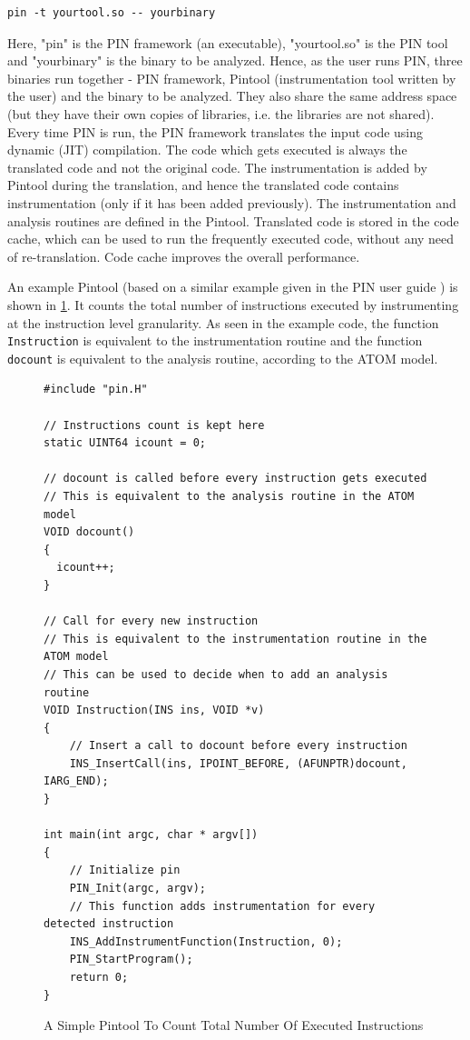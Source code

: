 \begin{lstlisting}
pin -t yourtool.so -- yourbinary
\end{lstlisting}
Here, "pin" is the PIN framework (an executable), "yourtool.so" is the PIN tool and "yourbinary" is the binary to be analyzed. Hence, as the user runs PIN, three binaries run together - PIN framework, Pintool (instrumentation tool written by the user) and the binary to be analyzed. They also share the same address space (but they have their own copies of libraries, i.e. the libraries are not shared). Every time PIN is run, the PIN framework translates the input code using dynamic (JIT) compilation. The code which gets executed is always the translated code and not the original code. The instrumentation is added by Pintool during the translation, and hence the translated code contains instrumentation (only if it has been added previously). The instrumentation and analysis routines are defined in the Pintool. Translated code is stored in the code cache, which can be used to run the frequently executed code, without any need of re-translation. Code cache improves the overall performance.

An example Pintool (based on a similar example given in the PIN user guide \citep{intelpinuserguide}) is shown in \cref{fig:fig23}. It counts the total number of instructions executed by instrumenting at the instruction level granularity. As seen in the example code, the function \texttt{Instruction} is equivalent to the instrumentation routine and the function \texttt{docount} is equivalent to the analysis routine, according to the ATOM model.

\begin{figure}
\begin{centering}
\begin{lstlisting}
#include "pin.H"

// Instructions count is kept here
static UINT64 icount = 0;

// docount is called before every instruction gets executed
// This is equivalent to the analysis routine in the ATOM model
VOID docount()
{
  icount++;
}

// Call for every new instruction
// This is equivalent to the instrumentation routine in the ATOM model
// This can be used to decide when to add an analysis routine
VOID Instruction(INS ins, VOID *v)
{
    // Insert a call to docount before every instruction
    INS_InsertCall(ins, IPOINT_BEFORE, (AFUNPTR)docount, IARG_END);
}

int main(int argc, char * argv[])
{
    // Initialize pin
    PIN_Init(argc, argv);
    // This function adds instrumentation for every detected instruction
    INS_AddInstrumentFunction(Instruction, 0);
    PIN_StartProgram();
    return 0;
}
\end{lstlisting}
\caption{A Simple Pintool To Count Total Number Of Executed Instructions\label{fig:fig23}}
\par\end{centering}
\end{figure}

